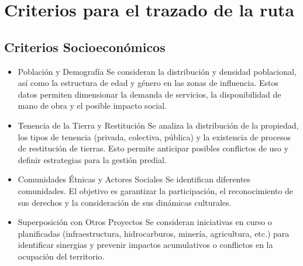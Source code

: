 

\section{Criterios para el trazado de la ruta}

\subsection{Criterios Socioeconómicos}
\begin{itemize}
    \item Población y Demografía
    \subitem Se consideran la distribución y densidad poblacional, así como la estructura de edad y género en las zonas de influencia. Estos datos permiten dimensionar la demanda de servicios, la disponibilidad de mano de obra y el posible impacto social.
    \\
    \item Tenencia de la Tierra y Restitución
    \subitem Se analiza la distribución de la propiedad, los tipos de tenencia (privada, colectiva, pública) y la existencia de procesos de restitución de tierras. Esto permite anticipar posibles conflictos de uso y definir estrategias para la gestión predial.
    \\
    \item Comunidades Étnicas y Actores Sociales
    \subitem Se identifican diferentes comunidades. El objetivo es garantizar la participación, el reconocimiento de sus derechos y la consideración de sus dinámicas culturales.
    \\
    \item Superposición con Otros Proyectos
    \subitem Se consideran iniciativas en curso o planificadas (infraestructura, hidrocarburos, minería, agricultura, etc.) para identificar sinergias y prevenir impactos acumulativos o conflictos en la ocupación del territorio.
\end{itemize}

